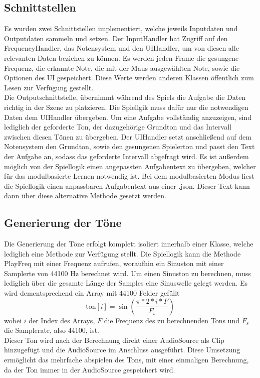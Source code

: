 \subsection*{Schnittstellen}
Es wurden zwei Schnittstellen implementiert, welche jeweils Inputdaten und Outputdaten sammeln und setzen. Der InputHandler hat Zugriff auf den FrequencyHandler, das Notensystem und den UIHandler, um von diesen alle relevanten Daten beziehen zu können. Es werden jeden Frame die gesungene Frequenz, die erkannte Note, die mit der Maus ausgewählten Note, sowie die Optionen des UI gespeichert. Diese Werte werden anderen Klassen öffentlich zum Lesen zur Verfügung gestellt. \\
Die Outputschnittstelle, übernimmt während des Spiels die Aufgabe die Daten richtig in der Szene zu platzieren. Die Spiellgik muss dafür nur die notwendigen Daten dem UIHandler übergeben. Um eine Aufgabe vollständig anzuzeigen, sind lediglich der geforderte Ton, der dazugehörige Grundton und das Intervall zwischen diesen Tönen zu übergeben. Der UIHandler setzt anschließend auf dem Notensystem den Grundton, sowie den gesungenen Spielerton und passt den Text der Aufgabe an, sodass das geforderte Intervall abgefragt wird. Es ist außerdem möglich von der Spiellogik einen angepassten Aufgabentext zu übergeben, welcher für das modulbasierte Lernen notwendig ist. Bei dem modulbasierten Modus liest die Spiellogik einen anpassbaren Aufgabentext aus einer .json. Dieser Text kann dann über diese alternative Methode gesetzt werden. 

\subsection*{Generierung der Töne}
Die Generierung der Töne erfolgt komplett isoliert innerhalb einer Klasse, welche lediglich eine Methode zur Verfügung stellt. Die Spiellogik kann die Methode PlayFreq mit einer Frequenz aufrufen, woraufhin ein Sinuston mit einer Samplerte von 44100 Hz berechnet wird. Um einen Sinuston zu berechnen, muss lediglich über die gesamte Länge der Samples eine Sinuswelle gelegt werden. Es wird dementsprechend ein Array mit 44100 Felder gefüllt
$$\text{ton}[i] = \sin(\frac{\pi * 2 * i * F}{F_s})$$ 
wobei $i$ der Index des Arrays, $F$ die Frequenz des zu berechnenden Tons und $F_s$ die Samplerate, also 44100, ist.\\
Dieser Ton wird nach der Berechnung direkt einer AudioSource als Clip hinzugefügt und die AudioSource im Anschluss ausgeführt. Diese Umsetzung ermöglicht das mehrfache abspielen des Tons, mit einer einmaligen Berechnung, da der Ton immer in der AudioSource gespeichert wird. 

